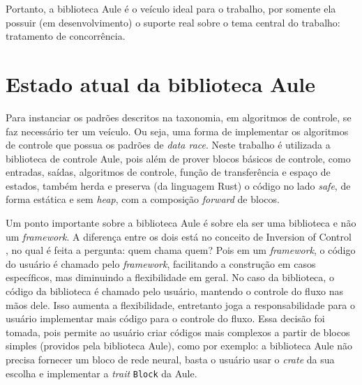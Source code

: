 Portanto, a biblioteca Aule é o veículo ideal para o trabalho, por somente ela possuir (em desenvolvimento) o suporte real sobre o tema central do trabalho: tratamento de concorrência.

\section{Estado atual da biblioteca Aule}
\label{sec:aule-state}

Para instanciar os padrões descritos na taxonomia, em algoritmos de controle, se faz necessário ter um veículo. Ou seja, uma forma de implementar os algoritmos de controle que possua os padrões de \textit{data race}. Neste trabalho é utilizada a biblioteca de controle Aule, pois além de prover blocos básicos de controle, como entradas, saídas, algoritmos de controle, função de transferência e espaço de estados, também herda e preserva (da linguagem Rust) o código no lado \textit{safe}, de forma estática e sem \textit{heap}, com a composição \textit{forward} de blocos.

Um ponto importante sobre a biblioteca Aule é sobre ela ser uma biblioteca e não um \textit{framework}. A diferença entre os dois está no conceito de Inversion of Control \citep{martin-fowler:inversion-of-control, johnson1988reusable}, no qual é feita a pergunta: quem chama quem? Pois em um \textit{framework}, o código do usuário é chamado pelo \textit{framework}, facilitando a construção em casos específicos, mas diminuindo a flexibilidade em geral. No caso da biblioteca, o código da biblioteca é chamado pelo usuário, mantendo o controle do fluxo nas mãos dele. Isso aumenta a flexibilidade, entretanto joga a responsabilidade para o usuário implementar mais código para o controle do fluxo. Essa decisão foi tomada, pois permite ao usuário criar códigos mais complexos a partir de blocos simples (providos pela biblioteca Aule), como por exemplo: a biblioteca Aule não precisa fornecer um bloco de rede neural, basta o usuário usar o \textit{crate} da sua escolha e implementar a \textit{trait} \texttt{Block} da Aule.

